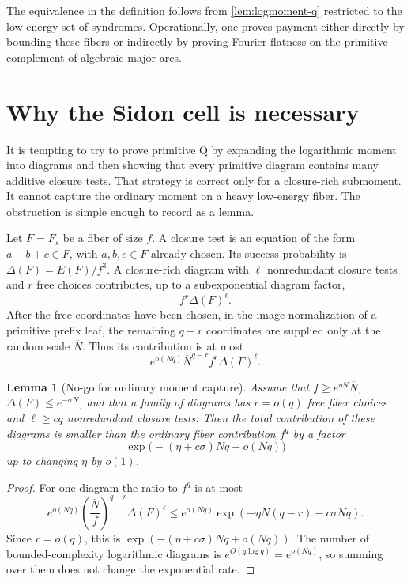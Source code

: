 \documentclass[12pt,a4paper]{amsart}
\numberwithin{equation}{section}
\newtheorem{lemma}[lemma]{Lemma}
\theoremstyle{remark}
\newcommand{\barN}{\overline N}
\begin{document}
The equivalence in the definition follows from \cref{lem:logmoment-q} restricted to the low-energy set of syndromes.  Operationally, one proves payment either directly by bounding these fibers or indirectly by proving Fourier flatness on the primitive complement of algebraic major arcs.


\section{Why the Sidon cell is necessary}\label{sec:sidon-necessity}

It is tempting to try to prove primitive Q by expanding the logarithmic moment into diagrams and then showing that every primitive diagram contains many additive closure tests.  That strategy is correct only for a closure-rich submoment.  It cannot capture the ordinary moment on a heavy low-energy fiber.  The obstruction is simple enough to record as a lemma.

Let \(F=F_s\) be a fiber of size \(f\).  A closure test is an equation of the form \(a-b+c\in F\), with \(a,b,c\in F\) already chosen.  Its success probability is \(\Delta(F)=E(F)/f^3\).  A closure-rich diagram with \(\ell\) nonredundant closure tests and \(r\) free choices contributes, up to a subexponential diagram factor,
\[
        f^r\Delta(F)^\ell .
\]
After the free coordinates have been chosen, in the image normalization of a primitive prefix leaf, the remaining \(q-r\) coordinates are supplied only at the random scale \(\barN\).  Thus its contribution is at most
\[
        e^{o(Nq)}\barN^{q-r}f^r\Delta(F)^\ell .
\]

\begin{lemma}[No-go for ordinary moment capture]\label{lem:no-go}
Assume that \(f\ge e^{\eta N}\barN\), \(\Delta(F)\le e^{-\sigma N}\), and that a family of diagrams has \(r=o(q)\) free fiber choices and \(\ell\ge c q\) nonredundant closure tests.  Then the total contribution of these diagrams is smaller than the ordinary fiber contribution \(f^q\) by a factor
\[
        \exp\bigl(-(\eta+c\sigma)Nq+o(Nq)\bigr)
\]
up to changing \(\eta\) by \(o(1)\).
\end{lemma}

\begin{proof}
For one diagram the ratio to \(f^q\) is at most
\[
        e^{o(Nq)}\left(\frac{\barN}{f}\right)^{q-r}\Delta(F)^\ell
        \le e^{o(Nq)}\exp(-\eta N(q-r)-c\sigma Nq).
\]
Since \(r=o(q)\), this is \(\exp(-(\eta+c\sigma)Nq+o(Nq))\).  The number of bounded-complexity logarithmic diagrams is \(e^{O(q\log q)}=e^{o(Nq)}\), so summing over them does not change the exponential rate.
\end{proof}
\end{document}
